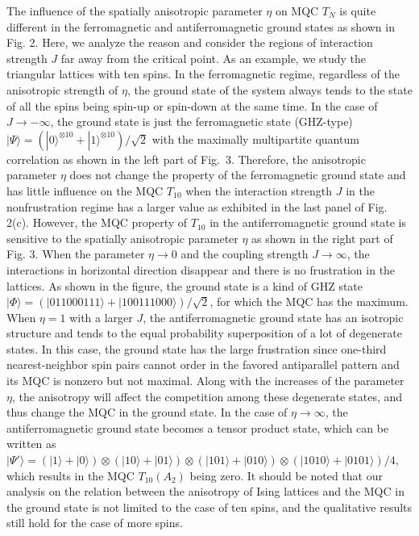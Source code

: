\documentclass[pra,aps,twocolumn,showpacs]{revtex4}
\newcommand{\ket}[1]{|#1\rangle}
\begin{document}
The influence of the spatially anisotropic parameter $\eta$ on MQC $T_{N}$ is quite different in the ferromagnetic and antiferromagnetic ground states as shown in Fig. 2. Here, we analyze the reason and consider the regions of interaction strength $J$ far away from the critical point. As an example, we study the triangular lattices with ten spins. In the ferromagnetic regime, regardless of the anisotropic strength of $\eta$, the ground state of the system always tends to the state of all the spins being spin-up or spin-down at the same time. In the case of $J\rightarrow -\infty$, the ground state is just the ferromagnetic state (GHZ-type) $\ket{\Psi}=(\ket{0}^{\otimes {10}}+\ket{1}^{\otimes {10}})/\sqrt{2}$ with the maximally multipartite quantum correlation as shown in the left part of Fig.~3. Therefore, the anisotropic parameter $\eta$ does not change the property of the ferromagnetic ground state and has little influence on the MQC $T_{10}$  when the interaction strength $J$ in the nonfrustration regime has a larger value as exhibited in the last panel of Fig. 2(c). However, the MQC property of $T_{10}$ in the antiferromagnetic ground state is sensitive to the spatially anisotropic parameter $\eta$ as shown in the right part of Fig. 3. When the parameter $\eta\rightarrow 0$ and the coupling strength $J\rightarrow \infty$, the interactions in horizontal direction disappear and there is no frustration in the lattices. As shown in the figure, the ground state is a kind of GHZ state $\ket{\Phi}=(\ket{011000111}+\ket{100111000})/\sqrt{2}$, for which the MQC has the maximum. When $\eta=1$ with a larger $J$, the antiferromagnetic ground state has an isotropic structure and tends to the equal probability superposition of a lot of degenerate states. In this case, the ground state has the large frustration since one-third nearest-neighbor spin pairs cannot order in the favored antiparallel pattern and its MQC is nonzero but not maximal. Along with the increases of the parameter $\eta$, the anisotropy will affect the competition among these degenerate states, and thus change the MQC in the ground state. In the case of $\eta\rightarrow \infty$, the antiferromagnetic ground state becomes a tensor product state, which can be written as $\ket{\Psi'}=(\ket{1}+\ket{0})\otimes(\ket{10}+\ket{01})\otimes(\ket{101}+\ket{010})\otimes(\ket{1010}+\ket{0101})/4$, which results in the MQC $T_{10}(A_2)$ being zero. It should be noted that our analysis on the relation between the anisotropy of Ising lattices and the MQC in the ground state is not limited to the case of ten spins, and the qualitative results still hold for the case of more spins.
\end{document}
